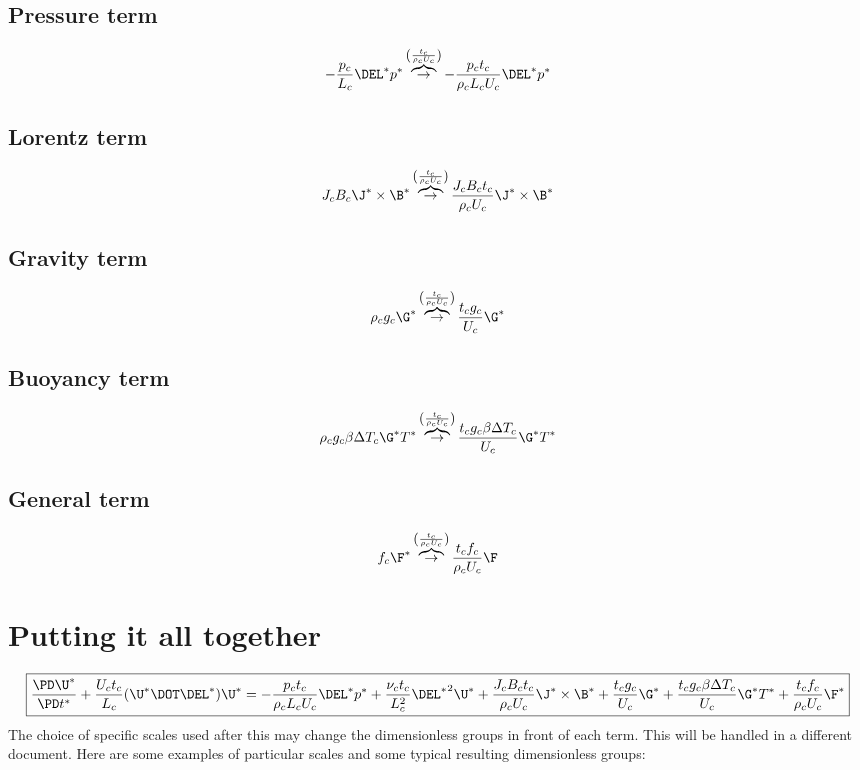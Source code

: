 \documentclass[11pt]{article}
\newcommand{\OB}{\overbrace{\rightarrow}^{\left(\frac{t_c}{\rho_c U_c}\right)}}
\begin{document}
\subsection{Pressure term}
\begin{equation}
	- \frac{p_c}{L_c} \DEL^*  p^*
	\OB
	- \frac{p_c t_c}{\rho_c L_c U_c} \DEL^*  p^*
\end{equation}
\subsection{Lorentz term}
\begin{equation}
	J_c B_c \J^* \times \B^*
	\OB
	\frac{J_c B_c t_c}{\rho_c U_c} \J^* \times \B^*
\end{equation}
\subsection{Gravity term}
\begin{equation}
	\rho_c g_c \G^*
	\OB
	\frac{t_c g_c}{U_c} \G^*
\end{equation}
\subsection{Buoyancy term}
\begin{equation}
	\rho_c g_c \beta \Delta T_c \G^* T^*
	\OB
	\frac{t_c g_c \beta \Delta T_c}{U_c} \G^* T^*
\end{equation}
\subsection{General term}
\begin{equation}
	f_c \F^*
	\OB
	\frac{t_c f_c}{\rho_c U_c} \F
\end{equation}

\section{Putting it all together}

\begin{equation}
	\boxed{
	\frac{\PD \U^*}{\PD t^*}
	+ \frac{U_c t_c}{L_c} (\U^* \DOT \DEL^*) \U^* = 
	- \frac{p_c t_c}{\rho_c L_c U_c} \DEL^*  p^*
	+ \frac{\nu_c t_c}{L_c^2} {\DEL^*}^2 \U^*
	+ \frac{J_c B_c t_c}{\rho_c U_c} \J^* \times \B^*
	+ \frac{t_c g_c}{U_c} \G^*
	+ \frac{t_c g_c \beta \Delta T_c}{U_c} \G^* T^*
	+ \frac{t_c f_c}{\rho_c U_c} \F^*
	}
\end{equation}
The choice of specific scales used after this may change the dimensionless groups in front of each term. This will be handled in a different document. Here are some examples of particular scales and some typical resulting dimensionless groups:
\end{document}
